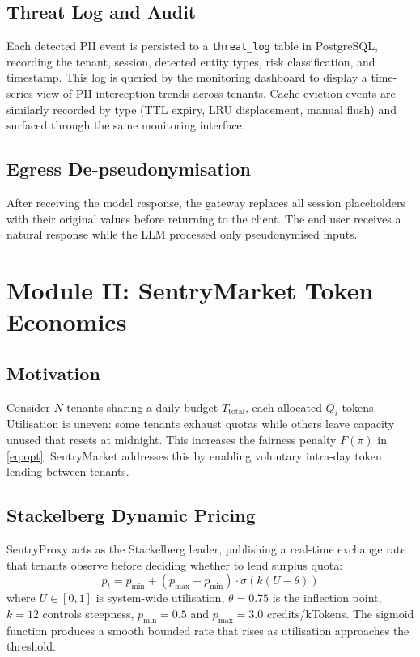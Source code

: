 \documentclass[conference]{IEEEtran}
\begin{document}
\subsection{Threat Log and Audit}
Each detected PII event is persisted to a \texttt{threat\_log} table in PostgreSQL, recording the tenant, session, detected entity types, risk classification, and timestamp. This log is queried by the monitoring dashboard to display a time-series view of PII interception trends across tenants. Cache eviction events are similarly recorded by type (TTL expiry, LRU displacement, manual flush) and surfaced through the same monitoring interface.

\subsection{Egress De-pseudonymisation}
After receiving the model response, the gateway replaces all session placeholders with their original values before returning to the client. The end user receives a natural response while the LLM processed only pseudonymised inputs.

\section{Module II: SentryMarket Token Economics}

\subsection{Motivation}
Consider $N$ tenants sharing a daily budget $T_{\text{total}}$, each allocated $Q_i$ tokens. Utilisation is uneven: some tenants exhaust quotas while others leave capacity unused that resets at midnight. This increases the fairness penalty $F(\pi)$ in \eqref{eq:opt}. SentryMarket addresses this by enabling voluntary intra-day token lending between tenants.

\subsection{Stackelberg Dynamic Pricing}
SentryProxy acts as the Stackelberg leader, publishing a real-time exchange rate that tenants observe before deciding whether to lend surplus quota:
\begin{equation}
p_t = p_{\min} + (p_{\max} - p_{\min}) \cdot \sigma\!\left(k\left(U - \theta\right)\right)
\label{eq:stackelberg}
\end{equation}
where $U \in [0,1]$ is system-wide utilisation, $\theta = 0.75$ is the inflection point, $k = 12$ controls steepness, $p_{\min} = 0.5$ and $p_{\max} = 3.0$ credits/kTokens. The sigmoid function produces a smooth bounded rate that rises as utilisation approaches the threshold.
\end{document}

